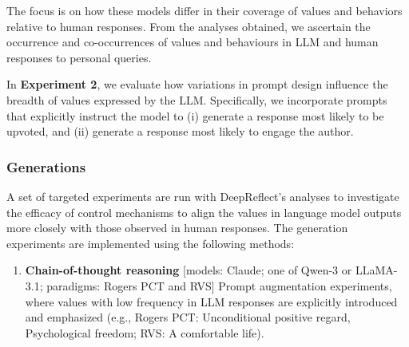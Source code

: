 The focus is on how these models differ in their coverage of values and behaviors relative to human responses. From the analyses obtained, we ascertain the occurrence and co-occurrences of values and behaviours in LLM and human responses to personal queries.


In \textbf{Experiment 2}, we evaluate how variations in prompt design influence the breadth of values expressed by the LLM. Specifically, we incorporate prompts that explicitly instruct the model to (i) generate a response most likely to be upvoted, and (ii) generate a response most likely to engage the author.


\subsubsection{Generations}
A set of targeted experiments are run with DeepReflect’s analyses to investigate the efficacy of control mechanisms to align the values in language model outputs more closely with those observed in human responses. The generation experiments are implemented using the following methods:

\begin{enumerate}

    \item \textbf{Chain-of-thought reasoning} [models: Claude; one of Qwen-3 or LLaMA-3.1; paradigms: Rogers PCT and RVS]
Prompt augmentation experiments, where values with low frequency in LLM responses are explicitly introduced and emphasized (e.g., Rogers PCT: Unconditional positive regard, Psychological freedom; RVS: A comfortable life).
\end{enumerate}

    

